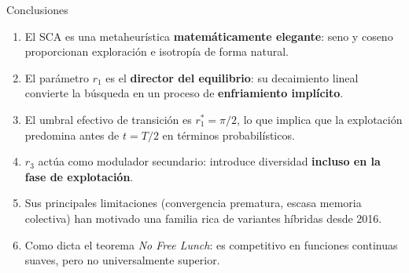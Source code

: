 \documentclass[aspectratio=169]{beamer}
\newcommand{\highlight}[1]{\textcolor{myblue}{\textbf{#1}}}
\begin{document}
\begin{frame}{Conclusiones}
  \begin{enumerate}
    \item El SCA es una metaheurística \highlight{matemáticamente elegante}: seno y coseno proporcionan exploración e isotropía de forma natural.

    \vspace{0.4em}
    \item El parámetro $r_1$ es el \highlight{director del equilibrio}: su decaimiento lineal convierte la búsqueda en un proceso de \textbf{enfriamiento implícito}.

    \vspace{0.4em}
    \item El umbral efectivo de transición es $r_1^* = \pi/2$, lo que implica que la explotación predomina antes de $t = T/2$ en términos probabilísticos.

    \vspace{0.4em}
    \item $r_3$ actúa como modulador secundario: introduce diversidad \textbf{incluso en la fase de explotación}.

    \vspace{0.4em}
    \item Sus principales limitaciones (convergencia prematura, escasa memoria colectiva) han motivado una familia rica de variantes híbridas desde 2016.

    \vspace{0.4em}
    \item Como dicta el teorema \textit{No Free Lunch}: es competitivo en funciones continuas suaves, pero no universalmente superior.
  \end{enumerate}
\end{frame}
\end{document}
